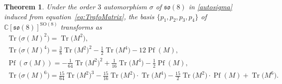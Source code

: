 \documentclass[10pt,a4paper]{amsart}
\numberwithin{equation}{section}
\newcommand{\Pf}{\operatorname{Pf}}
\newcommand{\Tr}{\operatorname{Tr}}
\newtheorem{Theorem}{Theorem}[section]
\begin{document}
\begin{Theorem}\label{prop:Trafo}
Under the order $3$ automorphism $\sigma$ of $\mathfrak{so}(8)$ in \eqref{autosigma} induced from equation~\eqref{eq:TrafoMatrix}, the basis $\{p_1 , p_2, p_3, p_4 \}$ of $\mathbb{C}[\mathfrak{so}(8)]^{\mathrm{SO}(8)}$ transforms as
 \begin{gather*}
\Tr\big(\sigma(M)^2\big) = \Tr\big(M^2\big), \\
\Tr\big(\sigma(M)^4\big) = \frac{3}{8} \Tr\big(M^2\big)^2 - \frac{1}{2} \Tr\big(M^4\big) -12 \Pf (M) , \\
\Pf (\sigma(M)) = - \frac{1}{64} \Tr\big(M^2\big)^2 + \frac{1}{16} \Tr\big(M^4\big) -\frac{1}{2} \Pf (M), \\
\Tr\big(\sigma(M)^6\big) = \frac{15}{64} \Tr\big(M^2\big)^3 - \frac{15}{16} \Tr\big(M^2\big) \cdot \Tr\big(M^4\big) - \frac{15}{2} \Tr\big(M^2\big) \cdot \Pf(M) + \Tr\big(M^6\big).
\end{gather*}
\end{Theorem}
\end{document}
